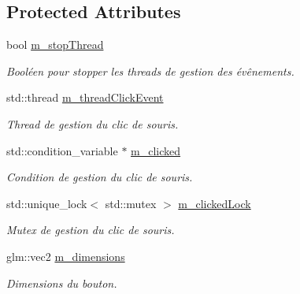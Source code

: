 \subsection*{Protected Attributes}
\begin{DoxyCompactItemize}
\item 
\hypertarget{classAbstractButton_a33c3fc97f6ef73e14100b5e509126b58}{bool \hyperlink{classAbstractButton_a33c3fc97f6ef73e14100b5e509126b58}{m\+\_\+stop\+Thread}}\label{classAbstractButton_a33c3fc97f6ef73e14100b5e509126b58}

\begin{DoxyCompactList}\small\item\em Booléen pour stopper les threads de gestion des évênements. \end{DoxyCompactList}\item 
\hypertarget{classAbstractButton_a178077a576ee755db7c839afea45bcc8}{std\+::thread \hyperlink{classAbstractButton_a178077a576ee755db7c839afea45bcc8}{m\+\_\+thread\+Click\+Event}}\label{classAbstractButton_a178077a576ee755db7c839afea45bcc8}

\begin{DoxyCompactList}\small\item\em Thread de gestion du clic de souris. \end{DoxyCompactList}\item 
\hypertarget{classAbstractButton_a949ebd940f2031815c706ff07f40a34c}{std\+::condition\+\_\+variable $\ast$ \hyperlink{classAbstractButton_a949ebd940f2031815c706ff07f40a34c}{m\+\_\+clicked}}\label{classAbstractButton_a949ebd940f2031815c706ff07f40a34c}

\begin{DoxyCompactList}\small\item\em Condition de gestion du clic de souris. \end{DoxyCompactList}\item 
\hypertarget{classAbstractButton_af964e22e2b6ee3fd0eb060dae764c425}{std\+::unique\+\_\+lock$<$ std\+::mutex $>$ \hyperlink{classAbstractButton_af964e22e2b6ee3fd0eb060dae764c425}{m\+\_\+clicked\+Lock}}\label{classAbstractButton_af964e22e2b6ee3fd0eb060dae764c425}

\begin{DoxyCompactList}\small\item\em Mutex de gestion du clic de souris. \end{DoxyCompactList}\item 
\hypertarget{classAbstractButton_aa2adf3970c7a506543514ca366c1be60}{glm\+::vec2 \hyperlink{classAbstractButton_aa2adf3970c7a506543514ca366c1be60}{m\+\_\+dimensions}}\label{classAbstractButton_aa2adf3970c7a506543514ca366c1be60}

\begin{DoxyCompactList}\small\item\em Dimensions du bouton. \end{DoxyCompactList}\end{DoxyCompactItemize}


